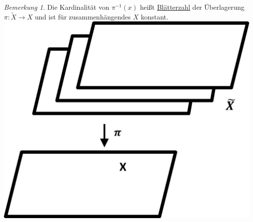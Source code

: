 \documentclass[a4paper,11pt,notitlepage]{report}
\theoremstyle{remark}
\newtheorem{remark}{Bemerkung}[chapter]
\theoremstyle{definition}
\begin{document}
\begin{remark}
	Die Kardinalität von $\pi^{-1}(x)$ heißt \underline{Blätterzahl} der Überlagerung $\pi \colon \tilde{X} \rightarrow X$ und ist für zusammenhängendes $X$ konstant.
	\newline \includegraphics[scale=0.4]{images/Blaetterzahl.jpg}
\end{remark}
\end{document}
